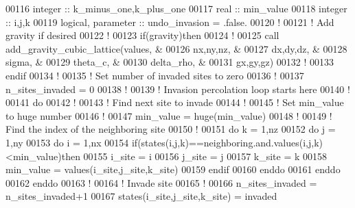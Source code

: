 \begin{DoxyCode}
00116     \textcolor{keywordtype}{integer} :: k\_minus\_one,k\_plus\_one  
00117     \textcolor{keywordtype}{real}    :: min\_value 
00118     \textcolor{keywordtype}{integer} :: i,j,k 
00119     \textcolor{keywordtype}{logical}, \textcolor{keywordtype}{parameter} :: undo\_invasion = .false.
00120     \textcolor{comment}{!}
00121     \textcolor{comment}{! Add gravity if desired}
00122     \textcolor{comment}{!}
00123     \textcolor{keyword}{if}(gravity)\textcolor{keyword}{then}
00124        \textcolor{comment}{!}
00125        call add\_gravity\_cubic\_lattice(values,    &
00126                                       nx,ny,nz,  &
00127                                       dx,dy,dz,  &
00128                                       sigma,     &
00129                                       theta\_c,   &
00130                                       delta\_rho, &
00131                                       gx,gy,gz)
00132        \textcolor{comment}{!}
00133     \textcolor{keyword}{endif}
00134     \textcolor{comment}{!}
00135     \textcolor{comment}{! Set number of invaded sites to zero}
00136     \textcolor{comment}{!}
00137     n\_sites\_invaded = 0
00138     \textcolor{comment}{!}
00139     \textcolor{comment}{! Invasion percolation loop starts here}
00140     \textcolor{comment}{!}
00141     \textcolor{keyword}{do}
00142        \textcolor{comment}{!}
00143        \textcolor{comment}{! Find next site to invade}
00144        \textcolor{comment}{!}
00145        \textcolor{comment}{! Set min\_value to huge number}
00146        \textcolor{comment}{!}
00147        min\_value = huge(min\_value)
00148        \textcolor{comment}{!}
00149        \textcolor{comment}{! Find the index of the neighboring site}
00150        \textcolor{comment}{!}
00151        \textcolor{keyword}{do} k = 1,nz
00152           \textcolor{keyword}{do} j = 1,ny
00153              \textcolor{keyword}{do} i = 1,nx
00154                 \textcolor{keyword}{if}(states(i,j,k)==neighboring.and.values(i,j,k)<min\_value)\textcolor{keyword}{then}
00155                    i\_site = i
00156                    j\_site = j
00157                    k\_site = k
00158                    min\_value = values(i\_site,j\_site,k\_site)
00159                 \textcolor{keyword}{endif}
00160              \textcolor{keyword}{enddo}
00161           \textcolor{keyword}{enddo}
00162        \textcolor{keyword}{enddo}
00163        \textcolor{comment}{!}
00164        \textcolor{comment}{! Invade site }
00165        \textcolor{comment}{!}
00166        n\_sites\_invaded = n\_sites\_invaded+1
00167        states(i\_site,j\_site,k\_site) = invaded

\end{DoxyCode}
